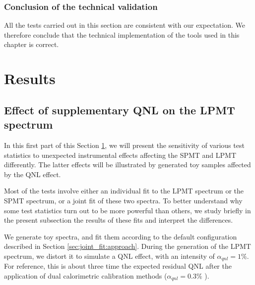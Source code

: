 \documentclass[../main.tex]{subfiles}
\begin{document}
\subsubsection{Conclusion of the technical validation}

All the tests carried out in this section are consistent with our expectation. We therefore conclude that the technical implementation of the tools used in this chapter is correct.



%
%
\section{Results}
\label{sec:joint_fit:results}

\subsection{Effect of supplementary QNL on the LPMT spectrum}

In this first part of this Section \ref{sec:joint_fit:results}, we will present the sensitivity of various test statistics to unexpected instrumental effects affecting the SPMT and LPMT differently. The latter effects will be illustrated by generated toy samples affected by the QNL effect.

Most of the tests involve either an individual fit to the LPMT spectrum or the SPMT spectrum, or a joint fit of these two spectra. To better understand why some test statistics turn out to be more powerful than others, we study briefly in the present subsection the results of these fits and interpret the differences.

We generate toy spectra, and fit them according to the default configuration described in Section \ref{sec:joint_fit:approach}.
During the generation of the LPMT spectrum, we distort it to simulate a QNL effect, with an intensity of $\alpha_{qnl}=1\%$. For reference, this is about three time the expected residual QNL after
the application of dual calorimetric calibration methods ($\alpha_{qnl} = 0.3\%$ \cite{juno_collaboration_calibration_2021}).
\end{document}
